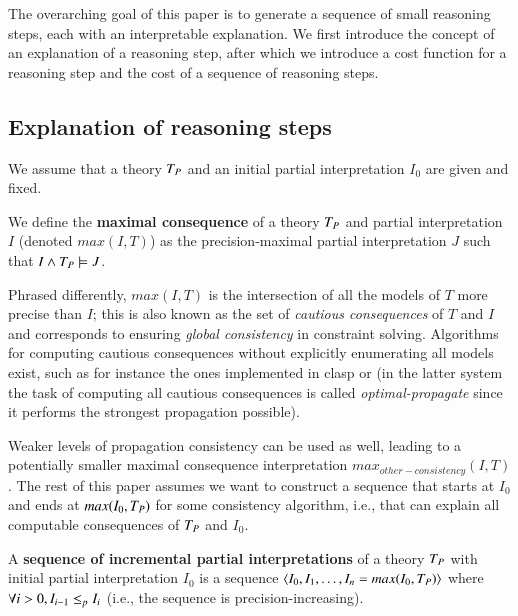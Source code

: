 
The overarching goal of this paper is to generate a sequence of small reasoning steps, each with an interpretable explanation. 
We first introduce the concept of an explanation of a reasoning step, after which we introduce a cost function for a reasoning step and the cost of a sequence of reasoning steps. 

\subsection{Explanation of reasoning steps}
We assume that a theory $T_P$ and an initial partial interpretation $I_0$ are given and fixed. 

\begin{definition}
We define the \textbf{maximal consequence} of a theory $T_P$ and partial interpretation $I$ (denoted $max(I,T)$) as the precision-maximal partial interpretation $J$ such that  $I \wedge T_P \models J$. 
\end{definition}

Phrased differently, $max(I,T)$ is the intersection of all the models of $T$ more precise than $I$; this is also known as the set of \emph{cautious consequences} of $T$ and $I$ and corresponds to ensuring \emph{global consistency} in constraint solving. 
Algorithms for computing cautious consequences without explicitly enumerating all models exist, such as for instance the ones implemented in clasp \cite{DBLP:conf/lpnmr/GebserKS09} or \idp \cite{IDP} (in the latter system the task of computing all cautious consequences is called \emph{optimal-propagate} since it performs the strongest propagation possible).

Weaker levels of propagation consistency can be used as well, leading to a potentially smaller maximal consequence interpretation $max_{other-consistency}(I,T)$. 
The rest of this paper assumes we want to construct a sequence that starts at $I_0$ and ends at $max(I_0,T_P)$ for some consistency algorithm, i.e., that can explain all computable consequences of $T_P$ and $I_0$. 
\begin{definition}
A \textbf{sequence of incremental partial interpretations} of a theory $T_P$ with initial partial interpretation $I_0$ is a sequence $\langle I_0, I_1, \ldots, I_n  = max(I_0,T_P)\rangle$ where $\forall i>0, I_{i-1} \leq_p I_{i}$ (i.e., the sequence is precision-increasing).
\end{definition} 

